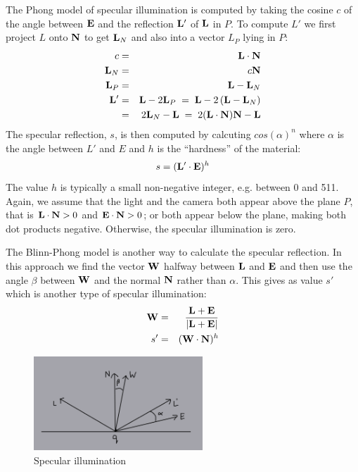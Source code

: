 \documentclass{book}
\newcommand{\vect}[1]{{\bf{ #1}}}
\begin{document}
The Phong model of specular illumination is computed by taking the cosine $c$ of the angle between ${\vect E}$ and
the reflection ${\vect L}'$ of ${\vect L}$ in $P$.
To compute $L'$ we first project $L$ onto ${\vect N}$ to get ${\vect L}_N$ and
also into a vector $L_P$ lying in $P$:
\begin{eqnarray*}
c &=& {\vect L} \cdot {\vect N}\\
{\vect L}_N &=& c {\vect N} \\
{\vect L}_P &=&  {\vect L} - {\vect L}_N \\
{\vect L}' &=& {\vect L} - 2 {\vect L}_P \;=\;  {\vect L} - 2 \left (  {\vect L} - {\vect L}_N     \right ) \\
&=&  2{\vect L}_N -{\vect L} \;=\;2 ({\vect L} \cdot {\vect N}) {\vect N} - {\vect L}
\end{eqnarray*}
The specular reflection, $s$, is then computed by calcuting $cos(\alpha)^n$ where $\alpha$
is the angle between $L'$ and $E$ and $h$ is the ``hardness'' of the material:
\[
s = ({\vect L'} \cdot {\vect E})^h
\]
The value $h$ is typically a small non-negative integer, e.g. between 0 and 511. Again, we assume that the light and the camera both appear above the plane $P$, that is ${\vect L}\cdot{\vect N}>0$ and ${\vect E}\cdot{\vect N}>0$; or both appear below the plane, making both dot products negative.   Otherwise, the specular illumination is zero.



The Blinn-Phong model is another way to calculate the specular reflection.
In this approach we find the vector $\vect W$ halfway between $\vect L$ and $\vect E$
and then use the angle $\beta$ between $\vect W$ and the normal $\vect N$ rather than $\alpha$. This gives
as value $s'$ which is another type of specular illumination:
\begin{eqnarray*}
{\vect W} &=& \frac{{\vect L}+{\vect E}}{\vert {\vect L} +{\vect E}\vert} \\
s' &=& ({\vect W} \cdot {\vect N})^h
\end{eqnarray*}

\begin{figure}[h]
\centering
\includegraphics[width=2.5in]{images/specular1.png}
\caption{Specular illumination}
\end{figure}
\end{document}
